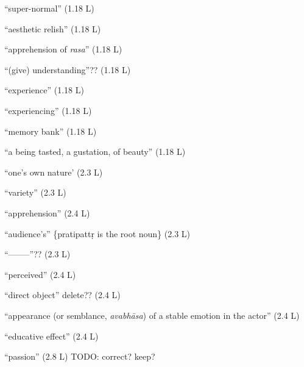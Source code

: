 \documentclass[10pt]{article}
\begin{document}
\begin{multicols}{2}
\begin{enumerate}[
			leftmargin=0em,
			rightmargin=0em,
		]
		 ``super-normal'' (1.18 L)

		 ``aesthetic relish'' (1.18 L)

		 ``apprehension of \textit{rasa}'' (1.18 L)

		 ``(give) understanding''?? (1.18 L)

		 ``experience'' (1.18 L)

		 ``experiencing'' (1.18 L)

		 ``memory bank'' (1.18 L)

		 ``a being tasted, a gustation, of beauty'' (1.18 L)

		 ``one's own nature' (2.3 L)

		 ``variety'' (2.3 L)

		 ``apprehension'' (2.4 L)

		 ``audience's'' \{pratipattṛ is the root noun\} (2.3 L)

		 ``--------''?? (2.3 L)

		 ``perceived'' (2.4 L)

		 ``direct object'' delete?? (2.4 L)

		 ``appearance (or semblance, \textit{avabhāsa}) of a stable emotion in the actor'' (2.4 L)

		 ``educative effect'' (2.4 L)

		 ``passion'' (2.8 L) TODO: correct? keep?




	\end{enumerate}
\end{multicols}

\end{document}
